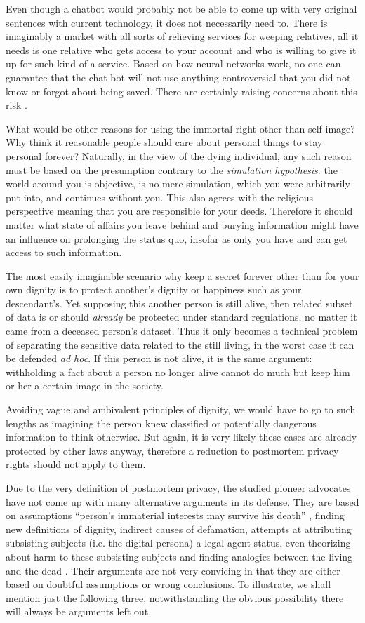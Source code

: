 \documentclass[a4paper]{article}
\begin{document}
Even though a chatbot would probably not be able to come up with very original sentences with current technology, it does not necessarily need to.
There is imaginably a market with all sorts of relieving services for weeping relatives, all it needs is one relative who gets access to your account and who is willing to give it up for such kind of a service.
Based on how neural networks work, no one can guarantee that the chat bot will not use anything controversial that you did not know or forgot about being saved. There are certainly raising concerns about this risk \cite{angstrom}.

What would be other reasons for using the immortal right other than self-image? Why think it reasonable people should care about personal things to stay personal forever? Naturally, in the view of the dying individual, any such reason must be based on the presumption contrary to the \textit{simulation hypothesis}: \cite{bostrom} the world around you is objective, is no mere simulation, which you were arbitrarily put into, and continues without you. This also agrees with the religious perspective meaning that you are responsible for your deeds.
Therefore it should matter what state of affairs you leave behind and burying information might have an influence on prolonging the status quo, insofar as only you have and can get access to such information.

The most easily imaginable scenario why keep a secret forever other than for your own dignity is to protect another's dignity or happiness such as your descendant's. Yet supposing this another person is still alive, then related subset of data is or should \emph{already} be protected under standard regulations, no matter it came from a deceased person's dataset. Thus it only becomes a technical problem of separating the sensitive data related to the still living, in the worst case it can be defended \emph{ad hoc}. If this person is not alive, it is the same argument: withholding a fact about a person no longer alive cannot do much but keep him or her a certain image in the society.

Avoiding vague and ambivalent principles of dignity, we would have to go to such lengths as imagining the person knew classified or potentially dangerous information to think otherwise. But again, it is very likely these cases are already protected by other laws anyway, therefore a reduction to postmortem privacy rights should not apply to them.

Due to the very definition of postmortem privacy, the studied pioneer advocates have not come up with many alternative arguments in its defense. They are based on assumptions ``person's immaterial interests may survive his death'' \cite{buitelaar}, finding new definitions of dignity, indirect causes of defamation, attempts at attributing subsisting subjects (i.e. the digital persona) a legal agent status, even theorizing about harm to these subsisting subjects and finding analogies between the living and the dead \cite{buitelaar, harbinja2}. Their arguments are not very convicing in that they are either based on doubtful assumptions or wrong conclusions. To illustrate, we shall mention just the following three, notwithstanding the obvious possibility there will always be arguments left out.
\end{document}
